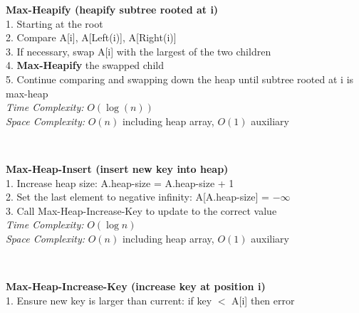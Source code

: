 \documentclass[a4paper]{extarticle}
\newcommand{\algofont}{\fontsize{4.3pt}{4.7pt}\selectfont}
\newcommand{\algocode}[1]{%
  \vspace{0pt}%
  \begin{algorithm}[H]
    \setlength{\abovecaptionskip}{0pt}%
    \setlength{\belowcaptionskip}{0pt}
    \setlength{\intextsep}{0pt}%
    \setlength{\textfloatsep}{0pt}
    \algofont  %
  \end{algorithm}%
  \vspace{0pt}%
}
\begin{document}
\begin{paracol}{3}
{\begin{minipage}[t]{1\linewidth}
    \begin{minipage}[t]{0.67\textwidth}
          \textbf{ Max-Heapify (heapify subtree rooted at i)}\\
          1. Starting at the root\\
          2. Compare A[i], A[Left(i)], A[Right(i)]\\
          3. If necessary, swap A[i] with the largest of the two children\\
          4. \textbf{Max-Heapify} the swapped child\\
          5. Continue comparing and swapping down the heap until subtree rooted at i is max-heap\\
          \textit{Time Complexity:} \(O(\log(n))\) \\ \textit{Space Complexity:} \(O(n)\) including heap array, \(O(1)\) auxiliary
    \end{minipage}
    \begin{minipage}[t]{0.32\textwidth}
      \vspace*{-25px}
      \algocode{heapify}
      \vspace*{-25px}
    \end{minipage}\\
    \begin{minipage}[t]{0.67\textwidth}   
          \textbf{ Max-Heap-Insert (insert new key into heap)}\\
          1. Increase heap size: A.heap-size = A.heap-size + 1\\
          2. Set the last element to negative infinity: A[A.heap-size] = $-\infty$\\
          3. Call Max-Heap-Increase-Key to update to the correct value\\
          \textit{Time Complexity:} \(O(\log n)\) \\ \textit{Space Complexity:} \(O(n)\) including heap array, \(O(1)\) auxiliary
    \end{minipage}
    \begin{minipage}[t]{0.32\textwidth}
      \vspace*{-16px}
      \algocode{heap-insert}
      \vspace*{-15px}
    \end{minipage}\\
    \begin{minipage}[t]{0.67\textwidth}
          \textbf{ Max-Heap-Increase-Key (increase key at position i)}\\
          1. Ensure new key is larger than current: if key $<$ A[i] then error\\

\end{minipage}
\end{minipage}}
\end{paracol}
\end{document}

